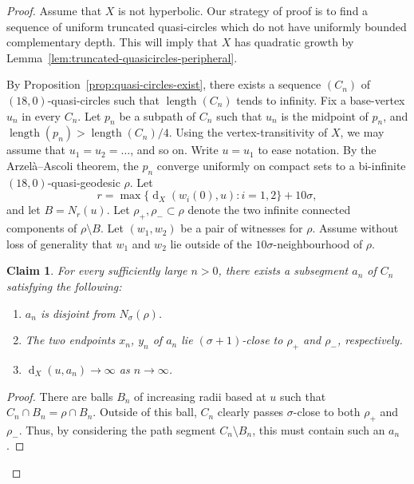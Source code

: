 \documentclass[11pt,a4paper]{amsart}
\DeclareMathOperator{\length}{length}
\DeclareMathOperator{\dist}{d}
\newtheorem{claim}[theorem]{Claim}
\theoremstyle{definition}
\begin{document}
\begin{proof}
    Assume that $X$ is not hyperbolic. Our strategy of proof is to find a sequence of uniform truncated quasi-circles which do not have uniformly bounded complementary depth. This will imply that $X$ has quadratic growth by Lemma~\ref{lem:truncated-quasicircles-peripheral}. 

    By Proposition~\ref{prop:quasi-circles-exist}, there exists a sequence $(C_n)$ of $(18,0)$-quasi-circles such that $\length(C_n)$ tends to infinity. Fix a base-vertex $u_n$ in every $C_n$. Let $p_n$ be a subpath of $C_n$ such that $u_n$ is the midpoint of $p_n$, and $\length(p_n) > \length(C_n) / 4$. 
    Using the vertex-transitivity of $X$, we may assume that 
    $
    u_1 = u_2 =  \ldots
    $, and so on. 
    Write $u = u_1$ to ease notation. 
    By the Arzel\`a--Ascoli theorem, the $p_n$ converge uniformly on compact sets to a bi-infinite $(18, 0)$-quasi-geodesic $\rho$. 
    Let 
    $$
    r = \max\{\dist_X(w_i(0), u) : i = 1,2\} + 10\sigma, 
    $$
    and let $B = N_r(u)$. Let $\rho_+, \rho_- \subset \rho$ denote the two infinite connected components of $\rho \setminus B$. 
    Let $(w_1, w_2)$ be a pair of witnesses for $\rho$. Assume without loss of generality that $w_1$ and $w_2$ lie outside of the $10\sigma$-neighbourhood of $\rho$. 
    

    \begin{claim}\label{claim:lands-either-side}
        For every sufficiently large $n > 0$, there exists a subsegment $a_n$ of $C_n$ satisfying the following:
        \begin{enumerate}
            \item $a_n$ is disjoint from $N_\sigma(\rho)$.

            \item The two endpoints $x_n$, $y_n$ of $a_n$ lie $(\sigma+1)$-close to $\rho_+$ and $\rho_-$, respectively. 

            \item $\dist_X(u, a_n) \to \infty$ as $n \to \infty$. 
        \end{enumerate}
    \end{claim}

    \begin{proof}
        There are balls $B_n$ of increasing radii based at $u$ such that $C_n \cap B_n = \rho \cap B_n$.  Outside of this ball, $C_n$ clearly passes $\sigma$-close to both $\rho_+$ and $\rho_-$. Thus, by considering the path segment $C_n \setminus B_n$, this must contain such an $a_n$. 
    \end{proof}



\end{proof}
\end{document}
